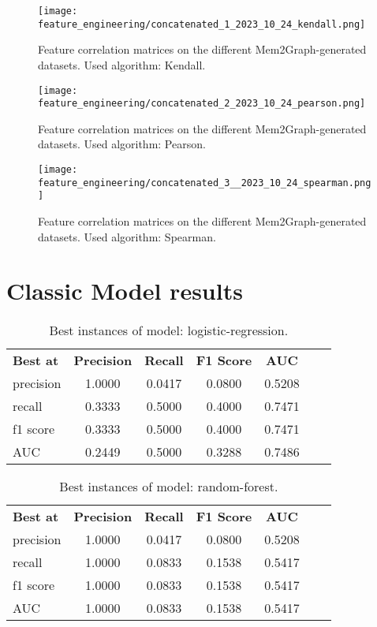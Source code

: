 \begin{figure}[H]\label{results:corr_matrices:kendall}
    \centering
    \texttt{[image: feature\_engineering/concatenated\_1\_2023\_10\_24\_kendall.png]}
    \caption{Feature correlation matrices on the different Mem2Graph-generated datasets. Used algorithm: Kendall.}
\end{figure}

\begin{figure}[H]\label{results:corr_matrices:pearson}
    \centering
    \texttt{[image: feature\_engineering/concatenated\_2\_2023\_10\_24\_pearson.png]}
    \caption{Feature correlation matrices on the different Mem2Graph-generated datasets. Used algorithm: Pearson.}
\end{figure}

\begin{figure}[H]\label{results:corr_matrices:spearman}
    \centering
    \texttt{[image: feature\_engineering/concatenated\_3\_\_2023\_10\_24\_spearman.png]}
    \caption{Feature correlation matrices on the different Mem2Graph-generated datasets. Used algorithm: Spearman.}
\end{figure}

\section{Classic Model results}


\begin{table}[H]
    \centering
    \caption{Best instances of model: logistic-regression.}
    \begin{tabular}{lcccccc}
      \textbf{Best at}  & \textbf{Precision} & \textbf{Recall} & \textbf{F1 Score} & \textbf{AUC} \\
        precision & 1.0000 & 0.0417 & 0.0800 & 0.5208 \\
        recall & 0.3333 & 0.5000 & 0.4000 & 0.7471 \\
        f1 score & 0.3333 & 0.5000 & 0.4000 & 0.7471 \\
        AUC & 0.2449 & 0.5000 & 0.3288 & 0.7486 \\
    \end{tabular}
\end{table}


\begin{table}[H]
    \centering
    \caption{Best instances of model: random-forest.}
    \begin{tabular}{lcccccc}
      \textbf{Best at}  & \textbf{Precision} & \textbf{Recall} & \textbf{F1 Score} & \textbf{AUC} \\
        precision & 1.0000 & 0.0417 & 0.0800 & 0.5208 \\
        recall & 1.0000 & 0.0833 & 0.1538 & 0.5417 \\
        f1 score & 1.0000 & 0.0833 & 0.1538 & 0.5417 \\
        AUC & 1.0000 & 0.0833 & 0.1538 & 0.5417 \\
    \end{tabular}
\end{table}


